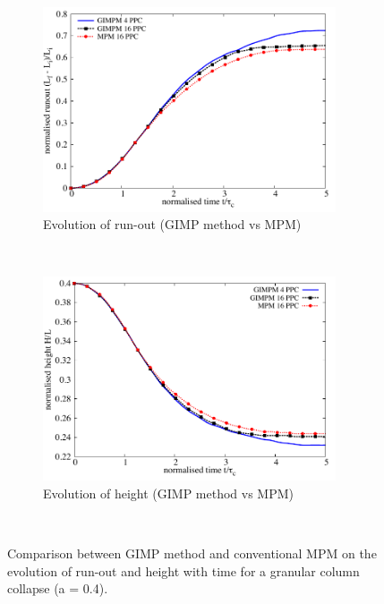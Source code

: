 \begin{figure}[tbhp]
	\centering
	\begin{subfigure}[b]{0.95\textwidth}
		\centering
		\includegraphics[width=0.95\textwidth]{Runout_MPM_GIMPM}
		\caption{Evolution of run-out (GIMP method vs MPM)}
		\label{fig:Runout_MPM_GIMPM}
	\end{subfigure} \\
	\begin{subfigure}[b]{0.95\textwidth}
		\centering 
		\includegraphics[width=0.95\textwidth]{Height_MPM_GIMP}
		\caption{Evolution of height (GIMP method vs MPM)}
		\label{fig:Height_MPM_GIMP}
	\end{subfigure} \\
	\caption{Comparison between GIMP method and conventional MPM on the 
	evolution of run-out and height with time for a granular column collapse (a 
	= 0.4).}
	\label{fig:MPM_GIMP}
\end{figure}


